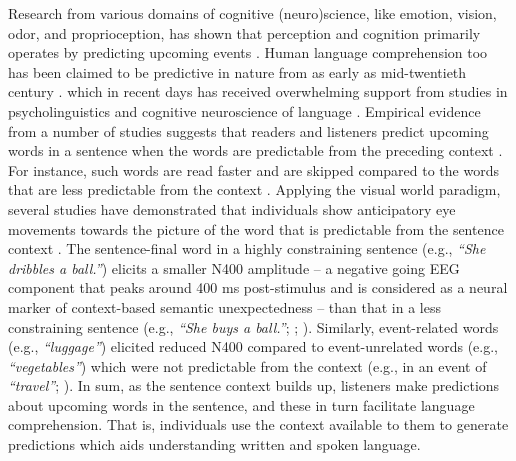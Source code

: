 \documentclass[a4paper, nobind]{templates/ociamthesis}
\begin{document}
Research from various domains of cognitive (neuro)science, like emotion, vision, odor, and proprioception, has shown that perception and cognition primarily operates by predicting upcoming events \autocite{Stadler2012,Clark2013,Seth2013,Marques2018}.
Human language comprehension too has been claimed to be predictive in nature from as early as mid-twentieth century \autocites[e.g.,][]{Miller1951,Mccullough1958,Morton1964}.
which in recent days has received overwhelming support from studies in psycholinguistics and cognitive neuroscience of language \autocites{Delong2005,Lupyan2015,Pickering2018}[cf.][]{Huettig2016}.
Empirical evidence from a number of studies suggests that readers and listeners predict upcoming words in a sentence when the words are predictable from the preceding context \autocites[for reviews][]{Staub2015,Kuperberg2016,Nieuwland2019}.
For instance, such words are read faster and are skipped compared to the words that are less predictable from the context \autocite{Ehrlich1981,Frisson2005,Staub2011}.
Applying the visual world paradigm, several studies have demonstrated that individuals show anticipatory eye movements towards the picture of the word that is predictable from the sentence context \autocite{Altmann1999,Kamide2003,Ankener2018}.
The sentence-final word in a highly constraining sentence (e.g., \emph{``She dribbles a ball.''}) elicits a smaller N400 amplitude -- a negative going EEG component that peaks around 400 ms post-stimulus and is considered as a neural marker of context-based semantic unexpectedness \autocite{Kutas2011} -- than that in a less constraining sentence (e.g., \emph{``She buys a ball.''}; \textcite{Kutas1984}; \textcite{Federmeier2007}).
Similarly, event-related words (e.g., \emph{``luggage''}) elicited reduced N400 compared to event-unrelated words (e.g., \emph{``vegetables''}) which were not predictable from the context (e.g., in an event of \emph{``travel''}; \textcite{Metusalem2012}).
In sum, as the sentence context builds up, listeners make predictions about upcoming words in the sentence, and these in turn facilitate language comprehension.
That is, individuals use the context available to them to generate predictions which aids understanding written and spoken language.
\end{document}
